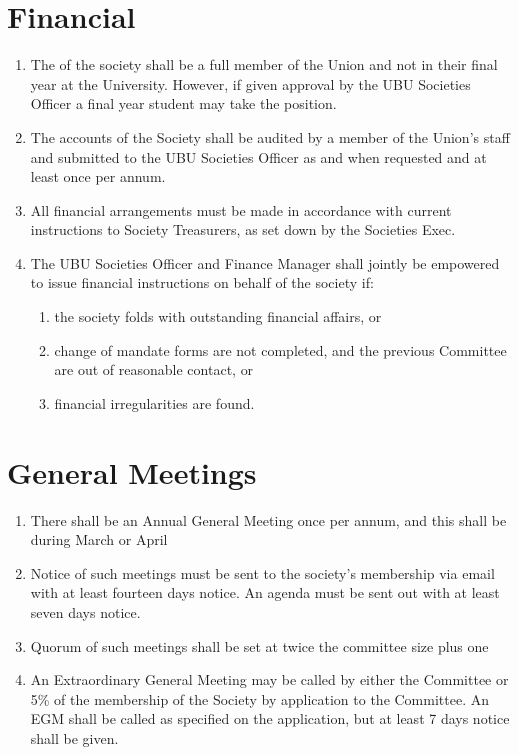 \documentclass[a4paper,10pt]{article}
\begin{document}
\section{Financial}
\begin{enumerate}
  \item The   of the society shall be a full member of the Union and not in their final year at the University. However, if given approval by the UBU Societies Officer a final year student may take the position.
  \item The accounts of the Society shall be audited by a member of the Union’s staff and submitted to the UBU Societies Officer as and when requested and at least once per annum.
  \item All financial arrangements must be made in accordance with current instructions to Society Treasurers, as set down by the Societies Exec.
  \item The UBU Societies Officer and Finance Manager shall jointly be empowered to issue financial instructions on behalf of the society if:
  \begin{enumerate}
    \item the society folds with outstanding financial affairs, or
    \item change of mandate forms are not completed, and the previous Committee are out of reasonable contact, or
    \item financial irregularities are found.
  \end{enumerate}
\end{enumerate}

\section{General Meetings}
\begin{enumerate}
  \item There shall be an Annual General Meeting once per annum, and this shall be during March or April
  \item Notice of such meetings must be sent to the society’s membership via email with at least fourteen days notice. An agenda must be sent out with at least seven days notice.
  \item Quorum of such meetings shall be set at twice the committee size plus one
  \item An Extraordinary General Meeting may be called by either the Committee or 5\% of the membership of the Society by application to the Committee. An EGM shall be called as specified on the application, but at least 7 days notice shall be given.
\end{enumerate}
\end{document}
